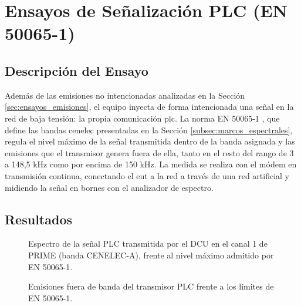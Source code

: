 
\section{Ensayos de Señalización PLC (EN 50065-1)}
\label{sec:ensayos_plc}

\subsection{Descripción del Ensayo}
\label{subsec:descripcion_ensayo_plc}

Además de las emisiones no intencionadas analizadas en la Sección \ref{sec:ensayos_emisiones}, el equipo inyecta de forma intencionada una señal en la red de baja tensión: la propia comunicación \gls{plc}. La norma EN 50065-1 \cite{EN50065_1}, que define las bandas \gls{cenelec} presentadas en la Sección \ref{subsec:marcos_espectrales}, regula el nivel máximo de la señal transmitida dentro de la banda asignada y las emisiones que el transmisor genera fuera de ella, tanto en el resto del rango de 3 a 148,5 kHz como por encima de 150 kHz. La medida se realiza con el módem en transmisión continua, conectando el \gls{eut} a la red a través de una red artificial y midiendo la señal en bornes con el analizador de espectro.

\subsection{Resultados}
\label{subsec:resultados_plc}

\begin{figure}[htbp]
    \centering
    \caption{Espectro de la señal PLC transmitida por el DCU en el canal 1 de PRIME (banda CENELEC-A), frente al nivel máximo admitido por EN 50065-1.}
    \label{fig:espectro_tx_plc}
\end{figure}

\begin{figure}[htbp]
    \centering
    \caption{Emisiones fuera de banda del transmisor PLC frente a los límites de EN 50065-1.}
    \label{fig:emisiones_fuera_banda_plc}
\end{figure}


